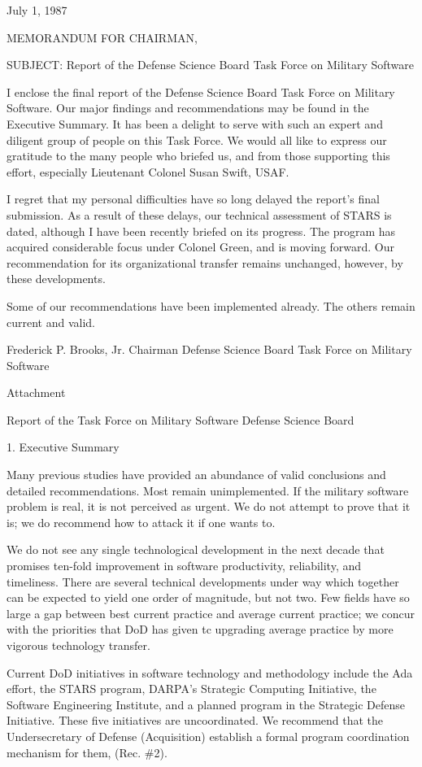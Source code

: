 \documentclass[12pt]{article}
\begin{document}
July 1, 1987

MEMORANDUM FOR CHAIRMAN,

SUBJECT: Report of the Defense Science Board Task Force on Military Software

I enclose the final report of the Defense Science Board Task Force on Military
Software.  Our major findings and recommendations may be found in the
Executive Summary.  It has been a delight to serve with such an expert and
diligent group of people on this Task Force. We would all like to express our
gratitude to the many people who briefed us, and from those supporting this
effort, especially Lieutenant Colonel Susan Swift, USAF.

I regret that my personal difficulties have so long delayed the report's final
submission.  As a result of these delays, our technical assessment of STARS is
dated, although I have been recently briefed on its progress.  The program has
acquired considerable focus under Colonel Green, and is moving forward.  Our
recommendation for its organizational transfer remains unchanged, however, by
these developments.

Some of our recommendations have been implemented already.  The others remain
current and valid.

Frederick P. Brooks, Jr.
Chairman
Defense Science Board
Task Force on Military Software

Attachment

Report of the Task Force on Military Software
Defense Science Board

1. Executive Summary

Many previous studies have provided an abundance of valid conclusions and
detailed recommendations. Most remain unimplemented. If the military software
problem is real, it is not perceived as urgent. We do not attempt to prove
that it is; we do recommend how to attack it if one wants to.

We do not see any single technological development in the next decade that
promises ten-fold improvement in software productivity, reliability, and
timeliness. There are several technical developments under way which together
can be expected to yield one order of magnitude, but not two. Few fields have
so large a gap between best current practice and average current practice; we
concur with the priorities that DoD has given tc upgrading average practice by
more vigorous technology transfer.

Current DoD initiatives in software technology and methodology include the Ada
effort, the STARS program, DARPA's Strategic Computing Initiative, the
Software Engineering Institute, and a planned program in the Strategic Defense
Initiative. These five initiatives are uncoordinated. We recommend that the
Undersecretary of Defense (Acquisition) establish a formal program
coordination mechanism for them, (Rec. \#2).
\end{document}
